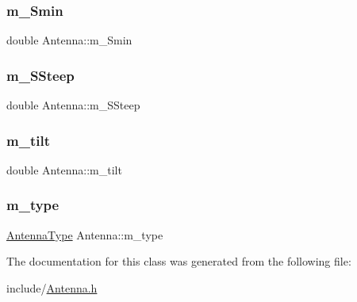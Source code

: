 \subsubsection{\texorpdfstring{m\_Smin}{m\_Smin}}
{\footnotesize\ttfamily double Antenna\+::m\+\_\+\+Smin\hspace{0.3cm}{\ttfamily [private]}}

\mbox{\label{class_antenna_a48117d47d70c758f5a09c54fa323feed}} 
\subsubsection{\texorpdfstring{m\_SSteep}{m\_SSteep}}
{\footnotesize\ttfamily double Antenna\+::m\+\_\+\+S\+Steep\hspace{0.3cm}{\ttfamily [private]}}

\mbox{\label{class_antenna_a039d6c95ae3a5e9d4973f647783062de}} 
\subsubsection{\texorpdfstring{m\_tilt}{m\_tilt}}
{\footnotesize\ttfamily double Antenna\+::m\+\_\+tilt\hspace{0.3cm}{\ttfamily [private]}}

\mbox{\label{class_antenna_a6b68373c8b139e8dafc4c11480eee0e1}} 
\subsubsection{\texorpdfstring{m\_type}{m\_type}}
{\footnotesize\ttfamily \mbox{\hyperlink{_antenna_type_8h_a7b678b5cb9dedc607131200119d96b16}{Antenna\+Type}} Antenna\+::m\+\_\+type\hspace{0.3cm}{\ttfamily [private]}}



The documentation for this class was generated from the following file\+:\begin{DoxyCompactItemize}
\item 
include/\mbox{\hyperlink{_antenna_8h}{Antenna.\+h}}\end{DoxyCompactItemize}
